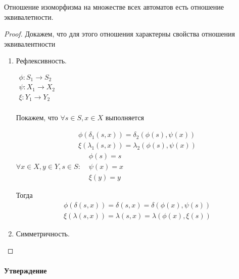 \begin{theorem}
    Отношение изоморфизма на множестве всех автоматов есть отношение эквивалетности.
\end{theorem}

\begin{proof}
    Докажем, что для этого отношения характерны свойства отношения эквивалентности
    \begin{enumerate}
        \item Рефлексивность.
        
        $\begin{matrix}
            \phi : S_1 \rightarrow S_2 \\
            \psi : X_1 \rightarrow X_2 \\
            \xi : Y_1 \rightarrow Y_2 \\
        \end{matrix}$

        Покажем, что $\forall s \in S, x \in X$ выполняется

        \begin{equation*}
            \begin{matrix}
                \phi(\delta_1(s, x)) = \delta_2(\phi(s), \psi(x)) \\
                \xi(\lambda_1(s, x)) = \lambda_2(\phi(s), \psi(x))
            \end{matrix}
        \end{equation*}
            $\forall x \in X, y \in Y, s \in S: ~~~
            \begin{matrix}
                \phi(s) = s \\
                \psi(x) = x \\
                \xi(y) = y  
            \end{matrix} $

        Тогда 
        \begin{equation*}
            \begin{matrix}
                \phi(\delta(s, x)) = \delta(s, x) = \delta(\phi(x), \psi(s)) \\
                \xi(\lambda(s, x)) = \lambda(s, x) = \lambda(\phi(x), \xi(s))
            \end{matrix}
        \end{equation*}
        \item Симметричность.
    \end{enumerate}
\end{proof}


\paragraph{Утверждение}






